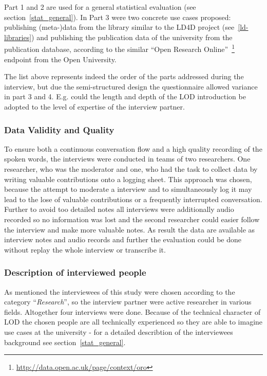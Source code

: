 Part 1 and 2 are used for a general statistical evaluation (see section~\ref{stat_general}). In Part 3 were two concrete use cases proposed: publishing (meta-)data from the library similar to the LD4D project (see~\ref{ld-libraries}) and publishing the publication data of the university from the publication database, according to the similar ``Open Research Online''~\footnote{\url{http://data.open.ac.uk/page/context/oro}} endpoint from the Open University.

The list above represents indeed the order of the parts addressed during the interview, but due the semi-structured design the questionnaire allowed variance in part 3 and 4. E.g. could the length and depth of the LOD introduction be adopted to the level of expertise of the interview partner.

\subsubsection{Data Validity and Quality}
To ensure both a continuous conversation flow and a high quality recording of the spoken words, the interviews were conducted in teams of two researchers. One researcher, who was the moderator and one, who had the task to collect data by writing valuable contributions onto a logging sheet. This approach was chosen, because the attempt to moderate a interview and to simultaneously log it may lead to the lose of valuable contributions or a frequently interrupted conversation. Further to avoid too detailed notes all interviews were additionally audio recorded so no information was lost and the second researcher could easier follow the interview and make more valuable notes.
As result the data are available as interview notes and audio records and further the evaluation could be done without replay the whole interview or transcribe it.

\subsubsection{Description of interviewed people}
As mentioned the interviewees of this study were chosen according to the category ``\textit{Research}'', so the interview partner were active researcher in various fields. Altogether four interviews were done. Because of the technical character of LOD the chosen people are all technically experienced so they are able to imagine use cases at the university - for a detailed describtion of the interviewees background see section~\ref{stat_general}.